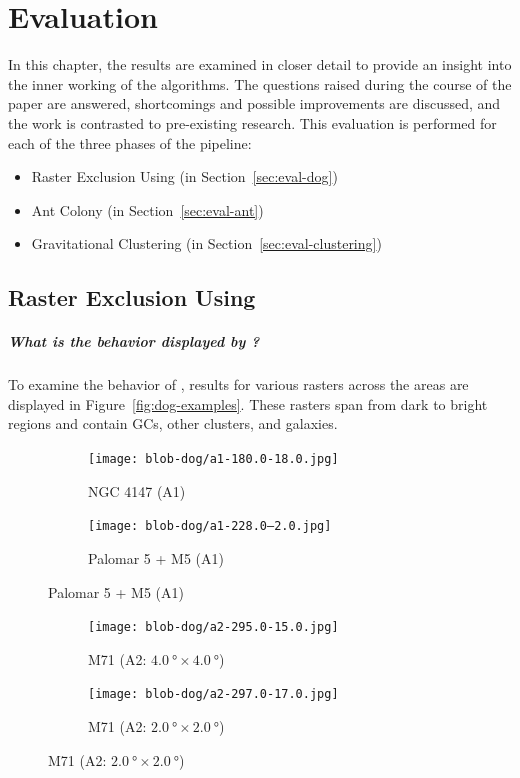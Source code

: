 \chapter{\label{chap:evaluation}Evaluation}

In this chapter, the results are examined in closer detail to provide an insight
into the inner working of the algorithms. The questions raised during the course
of the paper are answered, shortcomings and possible improvements are discussed,
and the work is contrasted to pre-existing research. This evaluation is
performed for each of the three phases of the pipeline:
\begin{itemize}
    \item Raster Exclusion Using \blobdog{} (in Section~{\ref{sec:eval-dog}})
    \item Ant Colony (in Section~\ref{sec:eval-ant})
    \item Gravitational Clustering (in Section~\ref{sec:eval-clustering})
\end{itemize}

\section{\label{sec:eval-dog}Raster Exclusion Using \blobdog{}}

\paragraph{What is the behavior displayed by \blobdog{}?}\paragraphnewline{}
\noindent To examine the behavior of \blobdog{}, results for various rasters across the
areas are displayed in Figure~\ref{fig:dog-examples}. These rasters span from
dark to bright regions and contain GCs, other clusters, and galaxies.
\begin{figure}[H]
    \centering
    \begin{subfigure}[b]{0.33\textwidth}
        \texttt{[image: blob-dog/a1-180.0-18.0.jpg]}
        \caption{\label{fig:ngc4147-dog} NGC 4147 (A1)}
    \end{subfigure}
    \begin{subfigure}[b]{0.33\textwidth}
        \texttt{[image: blob-dog/a1-228.0--2.0.jpg]}
        \caption{\label{fig:palomar5-and-M5} Palomar 5 + M5 (A1)}
    \end{subfigure}
\end{figure}

\begin{figure}[H]\ContinuedFloat{}
    \centering
    \begin{subfigure}[b]{0.33\textwidth}
        \texttt{[image: blob-dog/a2-295.0-15.0.jpg]}
        \caption{\label{fig:M71-dog-4b4} M71 (A2: $\SI{4.0}{\degree}\times\SI{4.0}{\degree}$)}
    \end{subfigure}
    \begin{subfigure}[b]{0.33\textwidth}
        \texttt{[image: blob-dog/a2-297.0-17.0.jpg]}
        \caption{\label{fig:M71-dog-2b2} M71 (A2: $\SI{2.0}{\degree}\times\SI{2.0}{\degree}$)}
    \end{subfigure}
\end{figure}

